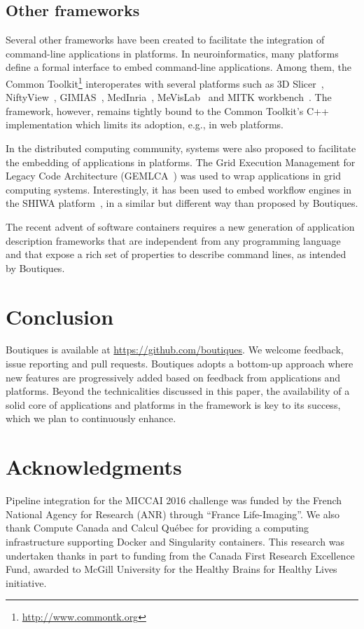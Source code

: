 \documentclass[a4paper,num-refs]{oup-contemporary}
\newcommand{\boutiques}{Boutiques\xspace}
\begin{document}
\subsection{Other frameworks}

Several other frameworks have been created to facilitate the
integration of command-line applications in platforms. In
neuroinformatics, many platforms define a formal interface to embed
command-line applications. Among them, the Common
Toolkit\footnote{\url{http://www.commontk.org}} interoperates with
several platforms such as 3D Slicer~\cite{pieper20043d},
NiftyView~\cite{Craddock2016}, GIMIAS~\cite{larrabide2009gimias},
MedInria~\cite{larrabide2009gimias}, MeVisLab~\cite{heckel2009object}
and MITK workbench~\cite{nolden2013medical}. The framework, however,
remains tightly bound to the Common Toolkit's C++ implementation which
limits its adoption, e.g., in web platforms.

In the distributed computing community, systems were also proposed to
facilitate the embedding of applications in platforms. The Grid
Execution Management for Legacy Code Architecture
(GEMLCA~\cite{delaitre2005gemlca}) was used to wrap applications in
grid computing systems. Interestingly, it has been used to embed
workflow engines in the SHIWA
platform~\cite{terstyanszky2014enabling}, in a similar but different
way than proposed by \boutiques.

The recent advent of software containers requires a new generation of
application description frameworks that are independent from any
programming language and that expose a rich set of properties to
describe command lines, as intended by \boutiques.

\section{Conclusion}

\boutiques is available at \url{https://github.com/boutiques}. We
welcome feedback, issue reporting and pull requests. \boutiques adopts
a bottom-up approach where new features are progressively added based
on feedback from applications and platforms. Beyond the technicalities
discussed in this paper, the availability of a solid core of
applications and platforms in the framework is key to its success,
which we plan to continuously enhance.

\section{Acknowledgments}

Pipeline integration for the MICCAI 2016 challenge was funded by the
French National Agency for Research (ANR) through ``France
Life-Imaging''. We also thank Compute Canada and Calcul Québec for
providing a computing infrastructure supporting Docker and Singularity
containers. This research was undertaken thanks in part to funding
from the Canada First Research Excellence Fund, awarded to McGill
University for the Healthy Brains for Healthy Lives initiative.


\end{document}
